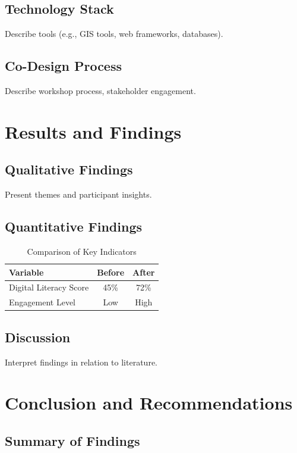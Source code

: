 \documentclass[12pt,a4paper,oneside]{report}
\begin{document}
\section{Technology Stack}
Describe tools (e.g., GIS tools, web frameworks, databases).

\section{Co-Design Process}
Describe workshop process, stakeholder engagement.

\chapter{Results and Findings}

\section{Qualitative Findings}
Present themes and participant insights.

\section{Quantitative Findings}
\begin{table}[h]
\centering
\begin{tabular}{lcc}
\toprule
Variable & Before & After \\
\midrule
Digital Literacy Score & 45\% & 72\% \\
Engagement Level & Low & High \\
\bottomrule
\end{tabular}
\caption{Comparison of Key Indicators}
\end{table}

\section{Discussion}
Interpret findings in relation to literature.

\chapter{Conclusion and Recommendations}

\section{Summary of Findings}
\end{document}
